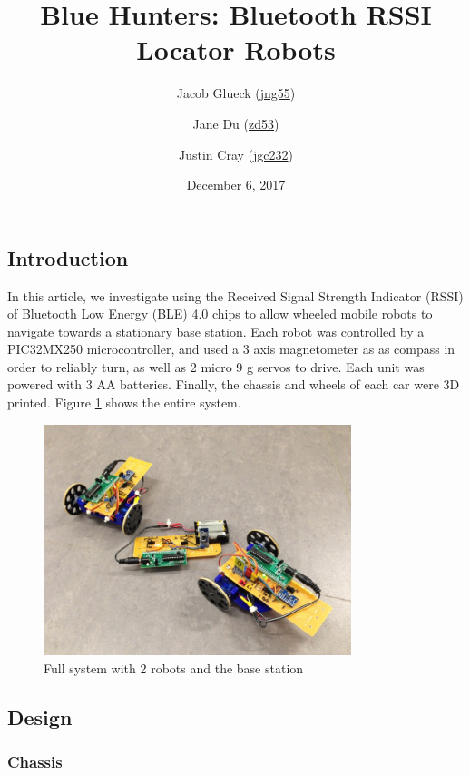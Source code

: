 \documentclass[]{article}
\title{Blue Hunters: Bluetooth RSSI Locator Robots}
\author{Jacob Glueck (\href{mailto:jng55@cornell.edu}{jng55}) \and Jane Du (\href{mailto:zd53@cornell.edu}{zd53}) \and Justin Cray (\href{mailto:jgc232@cornell.edu}{jgc232})}
\date{December 6, 2017}
\begin{document}
\maketitle

\hypertarget{introduction}{%
\subsection{Introduction}\label{introduction}}


In this article, we investigate using the Received Signal Strength Indicator (RSSI) of Bluetooth Low Energy (BLE) 4.0 chips to allow wheeled mobile robots to navigate towards a stationary base station.
Each robot was controlled by a PIC32MX250 microcontroller, and used a 3 axis magnetometer as as compass in order to reliably turn, as well as 2 micro 9 g servos to drive.
Each unit was powered with 3 AA batteries.
Finally, the chassis and wheels of each car were 3D printed.
Figure \ref{fig:robotsystem} shows the entire system.

\begin{figure}
  \centering
  \includegraphics[width=0.8\textwidth]{full_system.jpg}
  \caption{Full system with 2 robots and the base station}
  \label{fig:robotsystem}
\end{figure}

\subsection{Design}

\subsubsection{Chassis}
\end{document}
